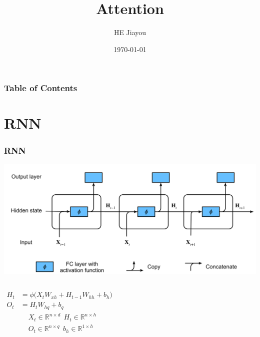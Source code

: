 \documentclass[]{beamer}
\title[]{Attention}
\author{HE Jiayou}
\date{\today}
\newcommand{\bb}[1]{\mathbb{#1}}
\newcommand{\x}{\times}
\begin{document}
\frame{\titlepage}

\begin{frame}
    \frametitle{Table of Contents}
    \tableofcontents[subsectionstyle=hide, subsubsectionstyle=hide]
\end{frame}

\section{RNN}
\begin{frame}
    \frametitle{RNN}
    \includegraphics[scale = 0.2]{RNN.png}
    \begin{columns}
        \begin{align*}
            H_t &= \phi\bigl(X_t W_{xh} + H_{t-1}W_{hh} + b_h\bigr) \\
            O_t &= H_t W_{hq} + b_q
        \end{align*}
        \begin{align*}
            &X_t \in \bb{R}^{n\x d}~~H_t \in \bb{R}^{n\x h} \\
            &O_t \in \bb{R}^{n\x q}~~b_h \in \bb{R}^{1\x h} \\
        \end{align*}
    \end{columns}
\end{frame}
\end{document}
